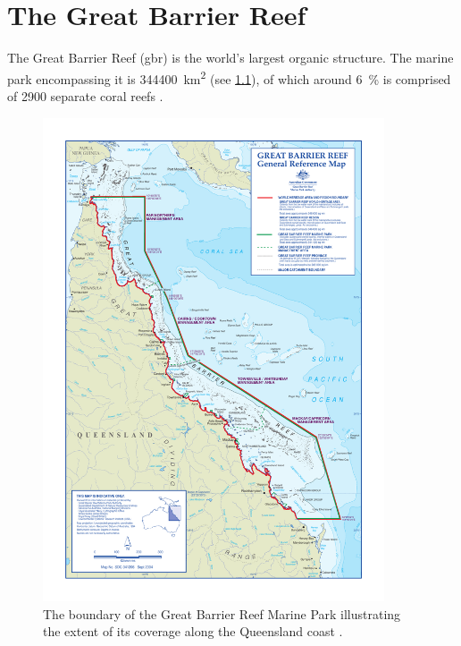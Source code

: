 




\chapter{The Great Barrier Reef}
\label{ch:gbr}

	The Great Barrier Reef (\gls{gbr}) is the world's largest organic structure. The marine park encompassing it is \SI{344400}{\square\km} (see \cref{fig:gbrboundary}), of which around \SI{6}{\percent} is comprised of \SI{2900}{} separate coral reefs \citep{borthwick:2006uv}.

	\begin{figure}[!htb]
	    \centering
	    \includegraphics[width=0.9\textwidth,natwidth=787,natheight=1135]{Fig/GBR_map.pdf}
	    \caption{The boundary of the Great Barrier Reef Marine Park illustrating the extent of its coverage along the Queensland coast \citep{borthwick:2006uv}.}
	    \label{fig:gbrboundary}
	\end{figure}

